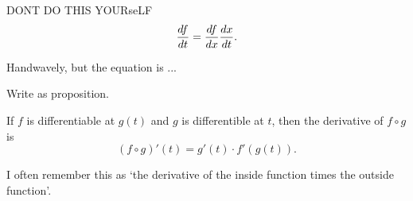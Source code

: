 DONT DO THIS YOURseLF
\[
\frac{d f}{d t} = \frac{d f}{d x} \frac{d x}{d t}.
\]

Handwavely, but the equation is ...

Write as proposition.

\begin{prop}
If $f$ is differentiable at $g(t)$ and $g$ is differentible at $t$, then the derivative of $f\circ g$ is
\[
(f\circ g)'(t) = g'(t)\cdot f'(g(t)).
\]
\end{prop}
\begin{rem}
I often remember this as `the derivative of the inside function times the outside function'.
\end{rem}


